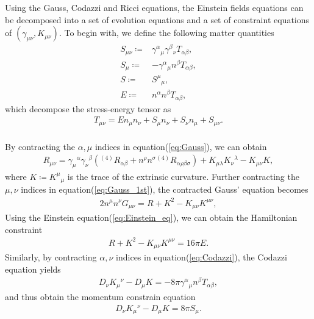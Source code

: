 Using the Gauss, Codazzi and Ricci equations,
the Einstein fields equations can be decomposed into a set of evolution equations and a set of constraint equations of $(\gamma_{\mu\nu}, K_{\mu\nu})$.
To begin with, we define the following matter quantities
\begin{align}
    S_{\mu\nu} \coloneqq& \gamma^{\alpha}{}_{\mu} \gamma^{\beta}{}_{\nu} T_{\alpha\beta}, \\
    S_\mu \coloneqq& - \gamma^{\alpha}{}_{\mu} n^{\beta} T_{\alpha\beta}, \\
    S \coloneqq& S^\mu{}_\mu, \\
    E \coloneqq& n^\alpha n^\beta T_{\alpha\beta},
\end{align}
which decompose the stress-energy tensor as
\begin{align}
    T_{\mu\nu} = E n_\mu n_\nu + S_\mu n_\nu + S_\nu n_\mu + S_{\mu\nu}.
\end{align}\\
By contracting the $\alpha,\mu$ indices in equation(\ref{eq:Gauss}), we can obtain
\begin{align}\label{eq:Gauss_1st}
    R_{\mu\nu} = \gamma_{\mu}{}^{\alpha}\gamma_{\nu}{}^{\beta} \left( {}^{(4)} R_{\alpha\beta} + n^\rho n^\sigma {}^{(4)}R_{\alpha\rho\beta\sigma} \right) + K_{\mu\lambda} K_\nu{}^{\lambda} - K_{\mu\nu} K,
\end{align}
where $K\coloneqq K^\mu{}_{\mu}$ is the trace of the extrinsic curvature.
Further contracting the $\mu, \nu$ indices in equation(\ref{eq:Gauss_1st}), the contracted Gauss' equation becomes
\begin{align}\label{eq:Gaussr_2nd}
    2 n^\mu n^\nu G_{\mu\nu} = R + K^2 - K_{\mu\nu} K^{\mu\nu},
\end{align}
Using the Einstein equation(\ref{eq:Einstein_eq}), we can obtain the Hamiltonian constraint
\begin{align}
    R + K^2 - K_{\mu\nu} K^{\mu\nu} = 16\pi E.
\end{align}
Similarly, by contracting $\alpha, \nu$ indices in equation(\ref{eq:Codazzi}), the Codazzi equation yields
\begin{align}
    D_{\nu} K_{\mu}{}^{\nu} - D_\mu K = - 8\pi \gamma^{\alpha}{}_{\mu} n^{\beta} T_{\alpha\beta},
\end{align}
and thus obtain the momentum constrain equation
\begin{align}
    D_{\nu} K_{\mu}{}^{\nu} - D_\mu K = 8 \pi S_{\mu}.
\end{align}\\
